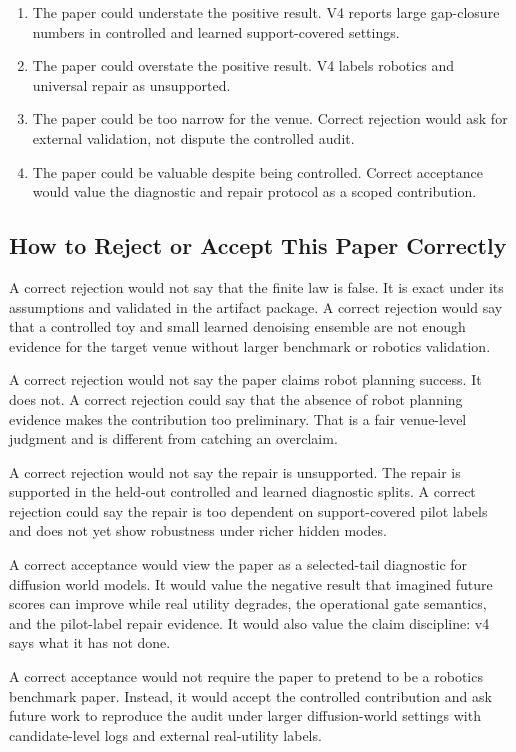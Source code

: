 \documentclass{article}
\begin{document}
\begin{enumerate}
\item The paper could understate the positive result. V4 reports large
gap-closure numbers in controlled and learned support-covered settings.
\item The paper could overstate the positive result. V4 labels robotics and
universal repair as unsupported.
\item The paper could be too narrow for the venue. Correct rejection would ask
for external validation, not dispute the controlled audit.
\item The paper could be valuable despite being controlled. Correct acceptance
would value the diagnostic and repair protocol as a scoped contribution.
\end{enumerate}

\subsection{How to Reject or Accept This Paper Correctly}
\label{app:v4-accept-reject}

A correct rejection would not say that the finite law is false. It is exact
under its assumptions and validated in the artifact package. A correct
rejection would say that a controlled toy and small learned denoising ensemble
are not enough evidence for the target venue without larger benchmark or
robotics validation.

A correct rejection would not say the paper claims robot planning success. It
does not. A correct rejection could say that the absence of robot planning
evidence makes the contribution too preliminary. That is a fair venue-level
judgment and is different from catching an overclaim.

A correct rejection would not say the repair is unsupported. The repair is
supported in the held-out controlled and learned diagnostic splits. A correct
rejection could say the repair is too dependent on support-covered pilot
labels and does not yet show robustness under richer hidden modes.

A correct acceptance would view the paper as a selected-tail diagnostic for
diffusion world models. It would value the negative result that imagined
future scores can improve while real utility degrades, the operational gate
semantics, and the pilot-label repair evidence. It would also value the claim
discipline: v4 says what it has not done.

A correct acceptance would not require the paper to pretend to be a robotics
benchmark paper. Instead, it would accept the controlled contribution and ask
future work to reproduce the audit under larger diffusion-world settings with
candidate-level logs and external real-utility labels.
\end{document}
